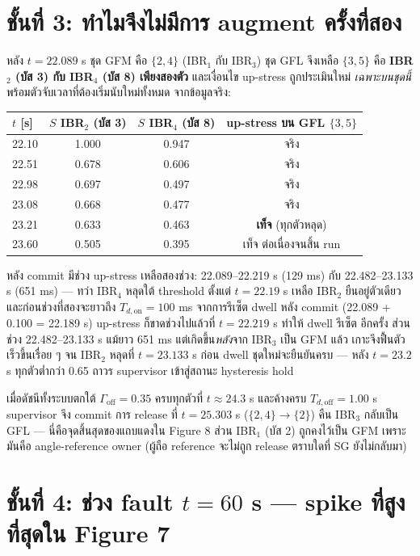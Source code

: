 \documentclass[11pt,a4paper]{article}
\begin{document}
\section{ชั้นที่ 3: ทำไมจึงไม่มีการ augment ครั้งที่สอง}

หลัง $t = 22.089$ s ชุด GFM คือ $\{2,4\}$ (IBR$_1$ กับ IBR$_3$) ชุด GFL
จึงเหลือ $\{3,5\}$ คือ \textbf{IBR$_2$ (บัส 3) กับ IBR$_4$ (บัส 8)
เพียงสองตัว} และเงื่อนไข up-stress ถูกประเมินใหม่ \emph{เฉพาะบนชุดนี้}
พร้อมตัวจับเวลาที่ต้องเริ่มนับใหม่ทั้งหมด จากข้อมูลจริง:

\begin{center}\small
\begin{tabular}{@{}lccc@{}}
\toprule
$t$ [s] & $S$ IBR$_2$ (บัส 3) & $S$ IBR$_4$ (บัส 8) & up-stress บน GFL $\{3,5\}$ \\
\midrule
22.10 & 1.000 & 0.947 & จริง \\
22.51 & 0.678 & 0.606 & จริง \\
22.98 & 0.697 & 0.497 & จริง \\
23.08 & 0.668 & 0.477 & จริง \\
23.21 & 0.633 & 0.463 & \textbf{เท็จ} (ทุกตัวหลุด) \\
23.60 & 0.505 & 0.395 & เท็จ ต่อเนื่องจนสิ้น run \\
\bottomrule
\end{tabular}
\end{center}

หลัง commit มีช่วง up-stress เหลือสองช่วง: 22.089--22.219 s (129 ms) กับ
22.482--23.133 s (651 ms) --- ทว่า IBR$_4$ หลุดใต้ threshold ตั้งแต่
$t = 22.19$ s เหลือ IBR$_2$ ยืนอยู่ตัวเดียว และก่อนช่วงที่สองจะยาวถึง
$T_{d,\mathrm{on}} = 100$ ms จากการรีเซ็ต dwell หลัง commit (22.089 + 0.100
= 22.189 s) up-stress ก็ขาดช่วงไปแล้วที่ $t = 22.219$ s ทำให้ dwell รีเซ็ต
อีกครั้ง ส่วนช่วง 22.482--23.133 s แม้ยาว 651 ms แต่เกิดขึ้น\emph{หลัง}จาก
IBR$_3$ เป็น GFM แล้ว เกาะจึงฟื้นตัวเร็วขึ้นเรื่อย ๆ จน IBR$_2$ หลุดที่
$t = 23.133$ s ก่อน dwell ชุดใหม่จะยืนยันครบ --- หลัง $t = 23.2$ s
ทุกตัวต่ำกว่า 0.65 ถาวร supervisor เข้าสู่สถานะ hysteresis hold

เมื่อดัชนีทั้งระบบตกใต้ $\Gamma_{\mathrm{off}} = 0.35$ ครบทุกตัวที่
$t \approx 24.3$ s และค้างครบ $T_{d,\mathrm{off}} = 1.00$ s supervisor
จึง commit การ release ที่ $t = 25.303$ s ($\{2,4\} \to \{2\}$)
คืน IBR$_3$ กลับเป็น GFL --- นี่คือจุดสิ้นสุดของแถบแดงใน Figure 8
ส่วน IBR$_1$ (บัส 2) ถูกคงไว้เป็น GFM เพราะมันคือ angle-reference owner
(ผู้ถือ reference จะไม่ถูก release ตราบใดที่ SG ยังไม่กลับมา)

\section{ชั้นที่ 4: ช่วง fault $t = 60$ s --- spike ที่สูงที่สุดใน Figure 7}
\end{document}
